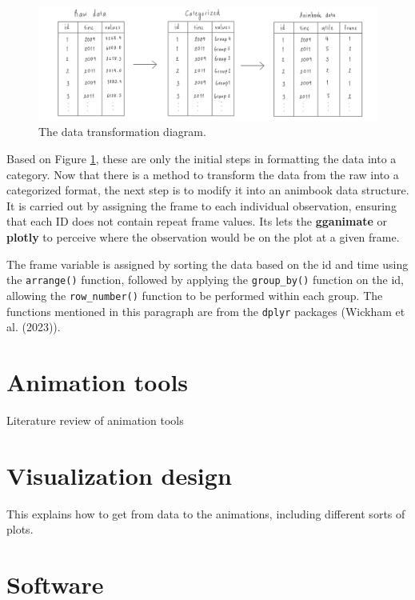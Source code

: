 \begin{figure}
\includegraphics[width=40.33in]{figures/data-diagram} \caption{The data transformation diagram.}\label{fig:data-diagram}
\end{figure}

Based on Figure \ref{fig:data-diagram}, these are only the initial steps in formatting the data into a category. Now that there is a method to transform the data from the raw into a categorized format, the next step is to modify it into an animbook data structure. It is carried out by assigning the frame to each individual observation, ensuring that each ID does not contain repeat frame values. Its lets the \textbf{gganimate} or \textbf{plotly} to perceive where the observation would be on the plot at a given frame.

The frame variable is assigned by sorting the data based on the id and time using the \texttt{arrange()} function, followed by applying the \texttt{group\_by()} function on the id, allowing the \texttt{row\_number()} function to be performed within each group. The functions mentioned in this paragraph are from the \texttt{dplyr} packages (Wickham et al. (2023)).

\hypertarget{animation-tools}{%
\section{Animation tools}\label{animation-tools}}

Literature review of animation tools

\hypertarget{visualization-design}{%
\section{Visualization design}\label{visualization-design}}

This explains how to get from data to the animations, including different sorts of plots.

\hypertarget{software}{%
\section{Software}\label{software}}

